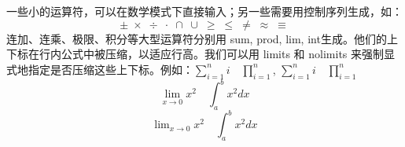 \documentclass{ctexart}
\begin{document}
一些小的运算符，可以在数学模式下直接输入；另一些需要用控制序列生成，如：
\[
\pm\; \times \; \div\; \cdot\; \cap\; \cup\;
\geq\; \leq\; \neq\; \approx \; \equiv
\]
连加、连乘、极限、积分等大型运算符分别用 sum, prod, lim, int生成。他们的上下标在行内公式中被压缩，以适应行高。我们可以用 limits 和 nolimits 来强制显式地指定是否压缩这些上下标。例如：$ \sum_{i=1}^n i\quad \prod_{i=1}^n $,
$ \sum\limits _{i=1}^n i\quad \prod\limits _{i=1}^n $
\[ \lim_{x\to0}x^2 \quad \int_a^b x^2 dx \]
\[ \lim\nolimits _{x\to0}x^2\quad \int\nolimits_a^b x^2 dx \]
\end{document}
